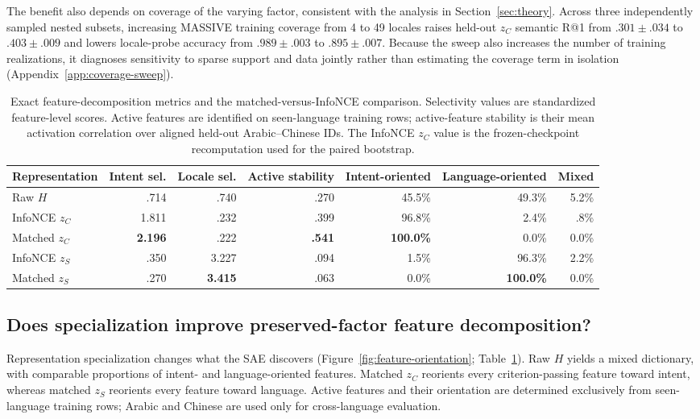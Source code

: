 \documentclass[11pt]{article}
\begin{document}
The benefit also depends on coverage of the varying factor, consistent with the analysis in Section~\ref{sec:theory}. Across three independently sampled nested subsets, increasing MASSIVE training coverage from 4 to 49 locales raises held-out $z_C$ semantic R@1 from $.301\pm.034$ to $.403\pm.009$ and lowers locale-probe accuracy from $.989\pm.003$ to $.895\pm.007$. Because the sweep also increases the number of training realizations, it diagnoses sensitivity to sparse support and data jointly rather than estimating the coverage term in isolation (Appendix~\ref{app:coverage-sweep}).

\begin{table}[!t]
\centering\scriptsize
\caption{Exact feature-decomposition metrics and the matched-versus-InfoNCE comparison. Selectivity values are standardized feature-level scores. Active features are identified on seen-language training rows; active-feature stability is their mean activation correlation over aligned held-out Arabic--Chinese IDs. The InfoNCE $z_C$ value is the frozen-checkpoint recomputation used for the paired bootstrap.}
\label{tab:concept-quality}
\begin{tabular*}{\textwidth}{@{\extracolsep{\fill}}lrrrrrr@{}}
\toprule
Representation & Intent sel. & Locale sel. & Active stability & Intent-oriented & Language-oriented & Mixed \\
\midrule
Raw $H$ & .714 & .740 & .270 & 45.5\% & 49.3\% & 5.2\% \\
InfoNCE $z_C$ & 1.811 & .232 & .399 & 96.8\% & 2.4\% & .8\% \\
Matched $z_C$ & \textbf{2.196} & .222 & \textbf{.541} & \textbf{100.0\%} & 0.0\% & 0.0\% \\
InfoNCE $z_S$ & .350 & 3.227 & .094 & 1.5\% & 96.3\% & 2.2\% \\
Matched $z_S$ & .270 & \textbf{3.415} & .063 & 0.0\% & \textbf{100.0\%} & 0.0\% \\
\bottomrule
\end{tabular*}
\end{table}

\subsection{Does specialization improve preserved-factor feature decomposition?}
Representation specialization changes what the SAE discovers (Figure~\ref{fig:feature-orientation}; Table~\ref{tab:concept-quality}). Raw $H$ yields a mixed dictionary, with comparable proportions of intent- and language-oriented features. Matched $z_C$ reorients every criterion-passing feature toward intent, whereas matched $z_S$ reorients every feature toward language. Active features and their orientation are determined exclusively from seen-language training rows; Arabic and Chinese are used only for cross-language evaluation.
\end{document}
